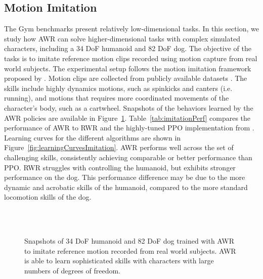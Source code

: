 \documentclass{article} \usepackage{iclr2020_conference,times}
\begin{document}
\subsection{Motion Imitation}
The Gym benchmarks present relatively low-dimensional tasks. In this section, we study how AWR can solve higher-dimensional tasks with complex simulated characters, including a 34 DoF humanoid and 82 DoF dog. The objective of the tasks is to imitate reference motion clips recorded using motion capture from real world subjects. The experimental setup follows the motion imitation framework proposed by \citet{2018-TOG-deepMimic}. Motion clips are collected from publicly available datasets \citep{CMUMocap,SFUMocap,Zhang2018MNN}. The skills include highly dynamics motions, such as spinkicks and canters (i.e. running), and motions that requires more coordinated movements of the character's body, such as a cartwheel. Snapshots of the behaviors learned by the AWR policies are available in Figure~\ref{fig:filmstripsImitation}. Table~\ref{tab:imitationPerf} compares the performance of AWR to RWR and the highly-tuned PPO implementation from \citet{2018-TOG-deepMimic}. Learning curves for the different algorithms are shown in Figure~\ref{fig:learningCurvesImitation}. AWR performs well across the set of challenging skills, consistently achieving comparable or better performance than PPO. RWR struggles with controlling the humanoid, but exhibits stronger performance on the dog. This performance difference may be due to the more dynamic and acrobatic skills of the humanoid, compared to the more standard locomotion skills of the dog.


\begin{figure}[t!]
	\centering
    \\
    \vspace{-0.25cm}
    \\
    \vspace{-0.25cm}
\caption{Snapshots of 34 DoF humanoid and 82 DoF dog trained with AWR to imitate reference motion recorded from real world subjects. AWR is able to learn sophisticated skills with characters with large numbers of degrees of freedom.}
\label{fig:filmstripsImitation}
\end{figure}
\end{document}
